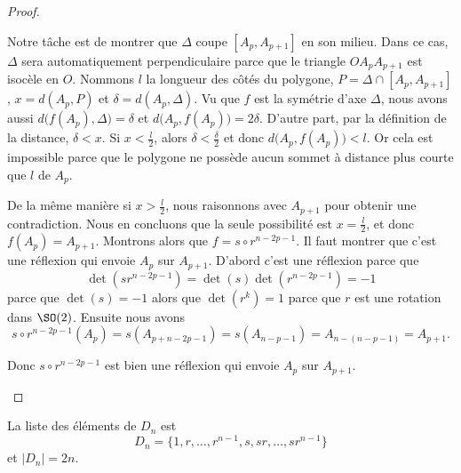 \begin{proof}
\begin{enumerate}
            Notre tâche est de montrer que \( \Delta\) coupe \( [A_p,A_{p+1}]\) en son milieu. Dans ce cas, \( \Delta\) sera automatiquement perpendiculaire parce que le triangle \( OA_pA_{p+1}\) est isocèle en \( O\). Nommons \( l\) la longueur des côtés du polygone, \( P=\Delta\cap[A_p,A_{p+1}]\), \( x=d(A_p,P)\) et \( \delta=d(A_p,\Delta)\). Vu que \( f\) est la symétrie d'axe \( \Delta\), nous avons aussi \( d\big( f(A_p),\Delta \big)=\delta\) et \( d\big( A_p,f(A_p) \big)=2\delta\). D'autre part, par la définition de la distance, \( \delta<x\). Si \( x<\frac{ l }{2}\), alors \( \delta<\frac{ \delta }{2}\) et donc \( d\big( A_p,f(A_p) \big)<l\). Or cela est impossible parce que le polygone ne possède aucun sommet à distance plus courte que \( l\) de \( A_p\).

            De la même manière si \( x>\frac{ l }{2}\), nous raisonnons avec \( A_{p+1}\) pour obtenir une contradiction. Nous en concluons que la seule possibilité est \( x=\frac{ l }{2}\), et donc \( f(A_p)=A_{p+1}\). Montrons alors que \( f=s\circ r^{n-2p-1}\). Il faut montrer que c'est une réflexion qui envoie \( A_p\) sur \( A_{p+1}\). D'abord c'est une réflexion parce que
            \begin{equation}
                \det(sr^{n-2p-1})=\det(s)\det(r^{n-2p-1})=-1
            \end{equation}
            parce que \( \det(s)=-1\) alors que \( \det(r^k)=1\) parce que \( r\) est une rotation dans \( \SO(2)\). Ensuite nous avons
            \begin{equation}
                s\circ r^{n-2p-1}(A_p)=s(A_{p+n-2p-1})=s(A_{n-p-1})=A_{n-(n-p-1)}=A_{p+1}.
            \end{equation}

            Donc \( s\circ r^{n-2p-1}\) est bien une réflexion qui envoie \( A_p\) sur \( A_{p+1}\).

    \end{enumerate}
\end{proof}

\begin{corollary}   \label{CorWYITsWW}
La liste des éléments de \( D_n\) est
\begin{equation}
    D_n=\{ 1,r,\ldots, r^{n-1},s,sr,\ldots, sr^{n-1} \}
\end{equation}
et \( | D_n |=2n\).
\end{corollary}

